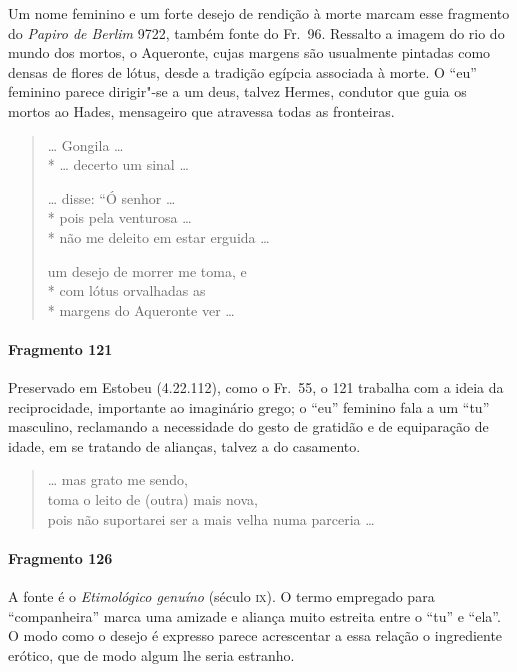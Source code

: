 {\small Um nome feminino e um forte desejo de rendição à morte marcam esse fragmento do
\textit{Papiro de Berlim }9722, também fonte do Fr.~96. Ressalto a imagem do
rio do mundo dos mortos, o Aqueronte, cujas margens são usualmente pintadas
como densas de flores de lótus, desde a tradição egípcia associada à morte. O “eu” feminino parece dirigir"-se a um deus,
talvez Hermes, condutor que guia os mortos ao Hades, mensageiro que atravessa todas as fronteiras.}

\begin{verse}
\ldots{} Gongila \ldots{}\\*
\ldots{} decerto um sinal \ldots{}

\ldots{} disse: “Ó senhor \ldots{}\\*
pois pela venturosa \ldots{}\\*
não me deleito em estar erguida \ldots{}

um desejo de morrer me toma, e\\*
com lótus orvalhadas as\\*
margens do Aqueronte ver \ldots{}
\end{verse}


\paragraph{Fragmento 121}

{\small Preservado em Estobeu (4.22.112), como o Fr.~55, o 121 trabalha com a ideia da
reciprocidade, importante ao imaginário grego; o “eu” feminino fala a um “tu”
masculino, reclamando a necessidade do gesto de gratidão e de equiparação de
idade, em se tratando de alianças, talvez a do casamento.}


\begin{verse}
\ldots{} mas grato me sendo,\\
toma o leito de (outra) mais nova, \\
pois não suportarei ser a mais velha numa \qb{}parceria \ldots{}
\end{verse}


\paragraph{Fragmento 126}

{\small A fonte é o \textit{Etimológico genuíno }(século \textsc{ix}). O termo empregado para
“companheira” marca uma amizade e aliança muito estreita entre o “tu”
e “ela”. O modo como o desejo é expresso parece acrescentar a essa relação o
ingrediente erótico, que de modo algum lhe seria estranho.}

